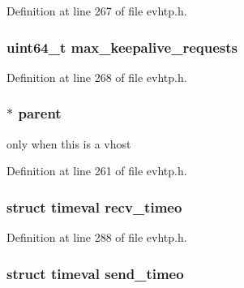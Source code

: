 \-Definition at line 267 of file evhtp.\-h.

\hypertarget{structevhtp__s_a79992dc6217af1d8e8801040ca6ef21e}{
\subsubsection[{max\-\_\-keepalive\-\_\-requests}]{\setlength{\rightskip}{0pt plus 5cm}uint64\-\_\-t {\bf max\-\_\-keepalive\-\_\-requests}}}\label{structevhtp__s_a79992dc6217af1d8e8801040ca6ef21e}


\-Definition at line 268 of file evhtp.\-h.

\hypertarget{structevhtp__s_adff9fa3bd346936d706e1a30c3bf4ca1}{
\subsubsection[{parent}]{$\ast$ {\bf parent}}}\label{structevhtp__s_adff9fa3bd346936d706e1a30c3bf4ca1}
only when this is a vhost 

\-Definition at line 261 of file evhtp.\-h.

\hypertarget{structevhtp__s_a485801666b7fb0cccc50d9fa42e5cbb9}{
\subsubsection[{recv\-\_\-timeo}]{\setlength{\rightskip}{0pt plus 5cm}struct timeval {\bf recv\-\_\-timeo}}}\label{structevhtp__s_a485801666b7fb0cccc50d9fa42e5cbb9}


\-Definition at line 288 of file evhtp.\-h.

\hypertarget{structevhtp__s_a7ffa291d73974047489f8880e5363603}{
\subsubsection[{send\-\_\-timeo}]{\setlength{\rightskip}{0pt plus 5cm}struct timeval {\bf send\-\_\-timeo}}}\label{structevhtp__s_a7ffa291d73974047489f8880e5363603}


